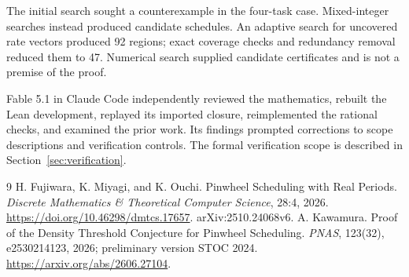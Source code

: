 \documentclass[11pt]{article}
\begin{document}
The initial search sought a counterexample in the four-task case. Mixed-integer searches instead produced candidate schedules. An adaptive search for uncovered rate vectors produced 92 regions; exact coverage checks and redundancy removal reduced them to 47. Numerical search supplied candidate certificates and is not a premise of the proof.

Fable 5.1 in Claude Code independently reviewed the mathematics, rebuilt the Lean development, replayed its imported closure, reimplemented the rational checks, and examined the prior work. Its findings prompted corrections to scope descriptions and verification controls. The formal verification scope is described in Section~\ref{sec:verification}.

\begin{thebibliography}{9}
H. Fujiwara, K. Miyagi, and K. Ouchi. Pinwheel Scheduling with Real Periods. \emph{Discrete Mathematics \& Theoretical Computer Science}, 28:4, 2026. \url{https://doi.org/10.46298/dmtcs.17657}. arXiv:2510.24068v6.
A. Kawamura. Proof of the Density Threshold Conjecture for Pinwheel Scheduling. \emph{PNAS}, 123(32), e2530214123, 2026; preliminary version STOC 2024. \url{https://arxiv.org/abs/2606.27104}.
\end{thebibliography}
\end{document}
